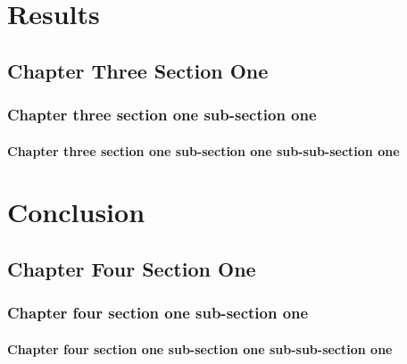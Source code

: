 \chapter{Results}
\section{Chapter Three Section One}
\subsection{Chapter three section one sub-section one}
\subsubsection{Chapter three section one sub-section one sub-sub-section one}


\chapter{Conclusion}
\section{Chapter Four Section One}
\subsection{Chapter four section one sub-section one}
\subsubsection{Chapter four section one sub-section one sub-sub-section one}

